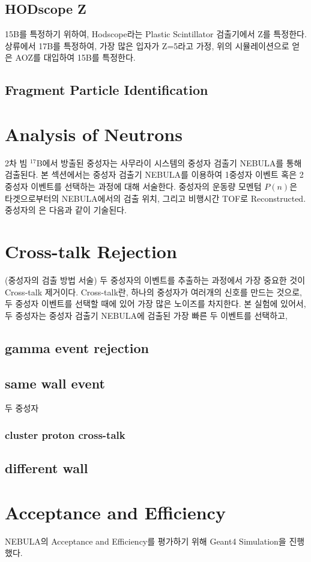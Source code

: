 \subsection{HODscope Z}
15B를 특정하기 위하여, Hodscope라는 Plastic Scintillator 검출기에서 Z를 특정한다.
상류에서 17B를 특정하여, 가장 많은 입자가 Z=5라고 가정, 위의 시뮬레이션으로 얻은 AOZ를 대입하여 15B를 특정한다.
\subsection{Fragment Particle Identification}

\clearpage

\section{Analysis of Neutrons}
2차 빔 ${}^{17}$B에서 방출된 중성자는 사무라이 시스템의 중성자 검출기 NEBULA를 통해 검출된다. 본 섹션에서는 중성자 검출기 NEBULA를 이용하여 1중성자 이벤트 혹은 2중성자 이벤트를 선택하는 과정에 대해 서술한다.
중성자의 운동량 모멘텀 $P(n)$은 타겟으로부터의 NEBULA에서의 검출 위치, 그리고 비행시간 TOF로 Reconstructed. 중성자의 은 다음과 같이 기술된다.


\section{Cross-talk Rejection}
(중성자의 검출 방법 서술) 두 중성자의 이벤트를 추출하는 과정에서 가장 중요한 것이 Cross-talk 제거이다. Cross-talk란, 하나의 중성자가 여러개의 신호를 만드는 것으로, 두 중성자 이벤트를 선택할 때에 있어 가장 많은 노이즈를 차지한다. 
본 실험에 있어서, 두 중성자는 중성자 검출기 NEBULA에 검출된 가장 빠른 두 이벤트를 선택하고, 

\subsection{gamma event rejection}

\subsection{same wall event}
두 중성자

\subsubsection{cluster proton cross-talk}


\subsection{different wall}

\section{Acceptance and Efficiency}
NEBULA의 Acceptance and Efficiency를 평가하기 위해 Geant4 Simulation을 진행했다. 